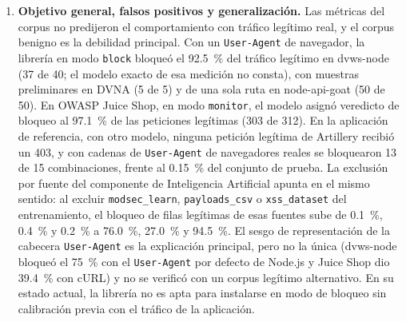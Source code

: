 \begin{enumerate}
    (B) La librería no sustituye al WAF. La cobertura de la Ronda~5
    casi no respalda esta afirmación: en condiciones equiparadas, la 3b frente a la Configuración~2
    con las cabeceras del proxy (794 de 800), el WAF suma solo 3 de 800 payloads (0.4~\%; 0.1--1.1~\%),
    todos de Command Injection. La combinación bloqueó 13 payloads más que la Configuración~2 sin
    esas cabeceras, una comparación que mezcla condiciones: 13 = 10 (efecto de las cabeceras que
    agrega el proxy) + 3 (aporte del WAF) (Sección~\ref{anx:sensibilidad}). La afirmación se sostiene
    en otras razones: la librería se evaluó solo en cuatro clases de ataque, de modo que no hay
    evidencia de cobertura fuera de ellas; su veredicto depende de un voto de árbol y de las
    cabeceras del despliegue, pues cuatro cabeceras de proxy cambiaron el veredicto de 14 de los 800
    payloads y dos de los tres payloads de Command Injection que ninguna configuración bloquea quedan
    a 0.0167 del umbral; y los bloqueos indebidos medidos en aplicaciones de terceros
    (conclusión~\ref{conc:fp}), con un umbral calibrado sobre la partición de validación y la
    aplicación de referencia, sin que se haya medido la tasa de falsos positivos del WAF. Es
    plausible que el corpus favorezca a la librería, por lo que sus cifras pueden ser optimistas y
    los 3 de 800 del WAF una cota inferior de su aporte; es una inferencia, no una medición
    (Sección~\ref{sec:met-validez}).

    \item \textbf{Objetivo general, falsos positivos y generalización.}\label{conc:fp} Las métricas del corpus no
    predijeron el comportamiento con tráfico legítimo real, y el corpus benigno es la debilidad
    principal. Con un \texttt{User-Agent} de navegador, la librería en modo \texttt{block} bloqueó el
    92.5~\% del tráfico legítimo en dvws-node (37 de 40; el modelo exacto de esa medición no consta),
    con muestras preliminares en DVNA (5 de 5) y de una sola ruta en node-api-goat (50 de 50). En
    OWASP Juice Shop, en modo \texttt{monitor}, el modelo asignó veredicto de bloqueo al 97.1~\% de
    las peticiones legítimas (303 de 312). En la aplicación de referencia, con otro modelo, ninguna
    petición legítima de Artillery recibió un 403, y con cadenas de \texttt{User-Agent} de
    navegadores reales se bloquearon 13 de 15 combinaciones, frente al 0.15~\% del conjunto de
    prueba. La exclusión por fuente del componente de Inteligencia Artificial \cite{valenzuela2026ia} apunta en el mismo
    sentido: al excluir \texttt{modsec\_learn}, \texttt{payloads\_csv} o \texttt{xss\_dataset} del
    entrenamiento, el bloqueo de filas legítimas de esas fuentes sube de 0.1~\%, 0.4~\% y 0.2~\% a
    76.0~\%, 27.0~\% y 94.5~\%. El sesgo de representación de la cabecera \texttt{User-Agent} es la
    explicación principal, pero no la única (dvws-node bloqueó el 75~\% con el \texttt{User-Agent}
    por defecto de Node.js y Juice Shop dio 39.4~\% con cURL) y no se verificó con un corpus legítimo
    alternativo. En su estado actual, la librería no es apta para instalarse en modo de bloqueo sin
    calibración previa con el tráfico de la aplicación.


\end{enumerate}
